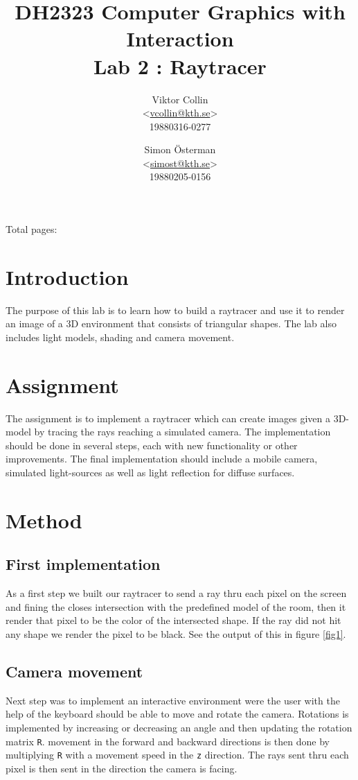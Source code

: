 \documentclass[a4paper,11pt]{article}
\author{Viktor Collin \\ <\url{vcollin@kth.se}> \\ 19880316-0277 \and Simon \"{O}sterman \\ <\url{simost@kth.se}> \\ 19880205-0156}
\title{\textbf{DH2323 Computer Graphics with Interaction \\ Lab 2 : Raytracer}}
\begin{document}
\maketitle
\begin{center}
Total pages: \pageref{LastPage}
\end{center}
\thispagestyle{empty}

\clearpage
\setcounter{page}{1}
\section{Introduction}
The purpose of this lab is to learn how to build a raytracer and use it to render an image of a 3D environment that consists of triangular shapes. The lab also includes light models, shading and camera movement. 
\section{Assignment}
The assignment is to implement a raytracer which can create images given a 3D-model by tracing the rays reaching a simulated camera. The implementation should be done in several steps, each with new functionality or other improvements. The final implementation should include a mobile camera, simulated light-sources as well as light reflection for diffuse surfaces.
\section{Method}
\subsection{First implementation}
As a first step we built our raytracer to send a ray thru each pixel on the screen and fining the closes intersection with the predefined model of the room, then it render that pixel to be the color of the intersected shape. If the ray did not hit any shape we  render the pixel to be black. See the output of this in figure \ref{fig1}.

\subsection{Camera movement}
Next step was to implement an interactive environment were the user with the help of the keyboard should be able to move and rotate the camera. Rotations is implemented by increasing or decreasing an angle and then updating the rotation matrix \verb|R|. movement in the forward and backward directions is then done by multiplying \verb|R| with a movement speed in the \verb|z| direction. The rays sent thru each pixel is then sent in the direction the camera is facing.
\end{document}
